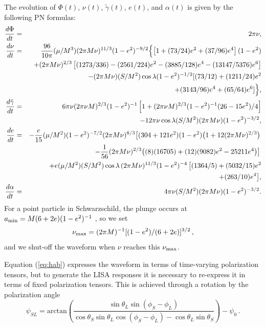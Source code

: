 \documentclass[12pt]{iopart}
\def\be{\begin{equation}}
\def\ee{\end{equation}}
\begin{document}
The evolution of $\Phi(t)$, $\nu(t)$, $\tilde\gamma(t)$, $e(t)$, and $\alpha(t)$ is given by the following PN formulas:
\begin{eqnarray}
\frac{d\Phi}{dt} &=& 2\pi\nu, \label{Phidot} \\
\frac{d\nu}{dt} &=&
\frac{96}{10\pi}(\mu/M^3)(2\pi M\nu)^{11/3}(1-e^2)^{-9/2}
\Bigl\{
\left[1+(73/24)e^2+(37/96)e^4\right](1-e^2) \nonumber \\
&&+ (2\pi M\nu)^{2/3}\left[(1273/336)-(2561/224)e^2-(3885/128)e^4
-(13147/5376)e^6 \right] \nonumber \\
&&- (2\pi M\nu)(S/M^2)\cos\lambda (1-e^2)^{-1/2}[(73/12)
+ (1211/24)e^2 \nonumber \\
&&+(3143/96)e^4 +(65/64)e^6]
\Bigr\}, \label{nudot} \\
%
\frac{d\tilde\gamma}{dt} &=& 6\pi\nu(2\pi\nu M)^{2/3} (1-e^2)^{-1}
\left[1+(2\pi\nu M)^{2/3} (1-e^2)^{-1}(26-15e^2)/4\right] \nonumber \\
&&-12\pi\nu\cos\lambda (S/M^2) (2\pi M\nu)(1-e^2)^{-3/2},
\label{Gamdot} \\
%
\frac{de}{dt}  &=& -\frac{e}{15}(\mu/M^2) (1-e^2)^{-7/2} (2\pi M\nu)^{8/3}
\bigl[(304+121e^2)(1-e^2)\bigl(1 + 12 (2\pi M\nu)^{2/3}\bigr) \, \nonumber \\
&&- \frac{1}{56}(2\pi M\nu)^{2/3}\bigl( (8)(16705) + (12)(9082)e^2 - 25211e^4 \bigr)\bigr]\,
\nonumber \\
&&+ e (\mu/M^2)(S/M^2)\cos\lambda\,(2\pi M\nu)^{11/3}(1-e^2)^{-4}
\, \bigl[(1364/5) + (5032/15)e^2 \nonumber \\ && + (263/10)e^4\bigr] ,
\label{edot} \\
%
\frac{d\alpha}{dt} &=& 4\pi\nu (S/M^2) (2\pi M\nu)(1-e^2)^{-3/2}.
\label{alphadot}
\end{eqnarray}
%
For a point particle in Schwarzschild, the plunge occurs at
$a_{\rm min} = M (6 + 2e)(1-e^2)^{-1}$ \cite{ckp},
so we set
\be\label{numax}
\nu_{\rm max} = (2\pi M)^{-1}[(1-e^2)/(6 + 2e)]^{3/2} \, ,
\ee
and we shut-off the waveform when $\nu$ reaches this $\nu_{\rm max}$.

Equation (\ref{eq:hab}) expresses the waveform in terms of time-varying polarization tensors, but to generate the LISA responses it is necessary to re-express it in terms of fixed polarization tensors. This is achieved through a rotation by the polarization angle
\begin{equation}\label{psiSL}
\psi_{SL} = \mathrm{arctan}\left(\frac{\sin\theta_L \sin(\phi_S-\phi_L)}{\cos \theta_S \sin \theta_L \cos(\phi_S - \phi_L) - \cos\theta_L \sin\theta_S}\right) - \psi_0\,.
\end{equation}
\end{document}
